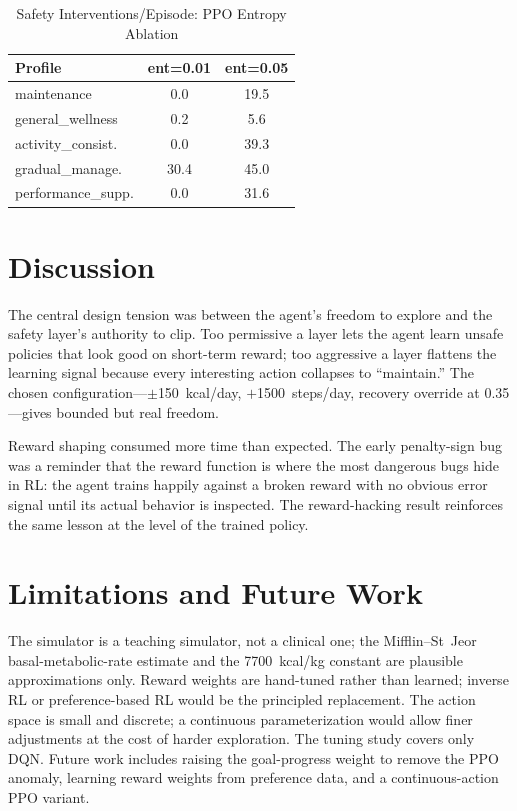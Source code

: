\documentclass[conference]{IEEEtran}
\begin{document}
\begin{table}[!t]
\renewcommand{\arraystretch}{1.2}
\caption{Safety Interventions/Episode: PPO Entropy Ablation}
\label{tab:highent}
\centering
\footnotesize
\begin{tabular}{@{}lcc@{}}
\toprule
\textbf{Profile} & \textbf{ent=0.01} & \textbf{ent=0.05} \\
\midrule
maintenance          & 0.0  & 19.5 \\
general\_wellness    & 0.2  & 5.6 \\
activity\_consist.   & 0.0  & 39.3 \\
gradual\_manage.     & 30.4 & 45.0 \\
performance\_supp.   & 0.0  & 31.6 \\
\bottomrule
\end{tabular}
\end{table}

\section{Discussion}
The central design tension was between the agent's freedom to explore and the
safety layer's authority to clip. Too permissive a layer lets the agent learn
unsafe policies that look good on short-term reward; too aggressive a layer
flattens the learning signal because every interesting action collapses to
``maintain.'' The chosen configuration---$\pm$150~kcal/day, $+$1500~steps/day,
recovery override at 0.35---gives bounded but real freedom.

Reward shaping consumed more time than expected. The early penalty-sign bug was a
reminder that the reward function is where the most dangerous bugs hide in RL: the
agent trains happily against a broken reward with no obvious error signal until
its actual behavior is inspected. The reward-hacking result reinforces the same
lesson at the level of the trained policy.

\section{Limitations and Future Work}
The simulator is a teaching simulator, not a clinical one; the Mifflin--St~Jeor
basal-metabolic-rate estimate \cite{mifflin} and the 7700~kcal/kg constant are
plausible approximations only. Reward weights are hand-tuned rather than learned;
inverse RL or preference-based RL would be the principled replacement. The action
space is small and discrete; a continuous parameterization would allow finer
adjustments at the cost of harder exploration. The tuning study covers only DQN.
Future work includes raising the goal-progress weight to remove the PPO anomaly,
learning reward weights from preference data, and a continuous-action PPO variant.
\end{document}
